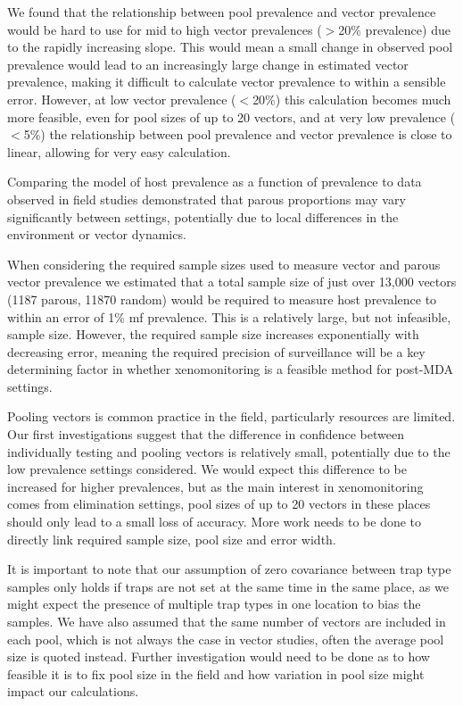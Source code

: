 We found that the relationship between pool prevalence and vector prevalence would be hard to use for mid to high vector prevalences ($>$20\% prevalence) due to the rapidly increasing slope. This would mean a small change in observed pool prevalence would lead to an increasingly large change in estimated vector prevalence, making it difficult to calculate vector prevalence to within a sensible error. However, at low vector prevalence ($<$20\%) this calculation becomes much more feasible, even for pool sizes of up to 20 vectors, and at very low prevalence ($<$5\%) the relationship between pool prevalence and vector prevalence is close to linear, allowing for very easy calculation.

Comparing the model of host prevalence as a function of prevalence to data observed in field studies demonstrated that parous proportions may vary significantly between settings, potentially due to local differences in the environment or vector dynamics.

When considering the required sample sizes used to measure vector and parous vector prevalence we estimated that a total sample size of just over 13,000 vectors (1187 parous, 11870 random) would be required to measure host prevalence to within an error of 1\% mf prevalence. This is a relatively large, but not infeasible, sample size. However, the required sample size increases exponentially with decreasing error, meaning the required precision of surveillance will be a key determining factor in whether xenomonitoring is a feasible method for post-MDA settings.

Pooling vectors is common practice in the field, particularly resources are limited. Our first investigations suggest that the difference in confidence between individually testing and pooling vectors is relatively small, potentially due to the low prevalence settings considered. We would expect this difference to be increased for higher prevalences, but as the main interest in xenomonitoring comes from elimination settings, pool sizes of up to 20 vectors in these places should only lead to a small loss of accuracy. More work needs to be done to directly link required sample size, pool size and error width. 

It is important to note that our assumption of zero covariance between trap type samples only holds if traps are not set at the same time in the same place, as we might expect the presence of multiple trap types in one location to bias the samples. We have also assumed that the same number of vectors are included in each pool, which is not always the case in vector studies, often the average pool size is quoted instead. Further investigation would need to be done as to how feasible it is to fix pool size in the field and how variation in pool size might impact our calculations.

